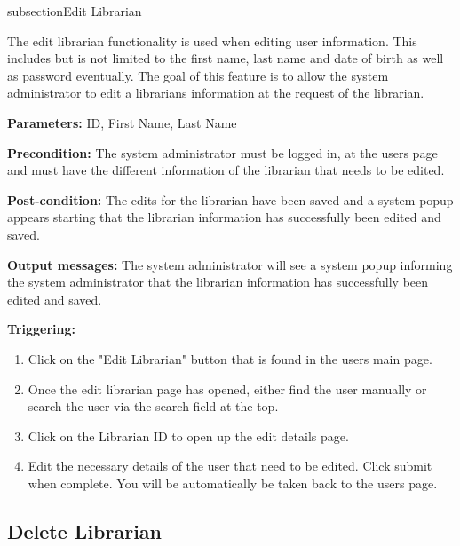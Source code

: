 subsection{Edit Librarian}

The edit librarian functionality is used when editing user information. This includes but is not limited to the first name, last name and date of birth as well as password eventually. The goal of this feature is to allow the system administrator to edit a librarians information at the request of the librarian. 

\begin{description}

\item \textbf{Parameters:} ID, First Name, Last Name

\item \textbf{Precondition:} The system administrator must be logged in, at the users page and must have the different information of the librarian that needs to be edited.

\item \textbf{Post-condition:} The edits for the librarian have been saved and a system popup appears starting that the librarian information has successfully been edited and saved. 

\item \textbf{Output messages:} The system administrator will see a system popup informing the system administrator that the librarian information has successfully been edited and saved.

\item \textbf{Triggering:}
\begin{enumerate}

\item Click on the "Edit Librarian" button that is found in the users main page.

\item Once the edit librarian page has opened, either find the user manually or search the user via the search field at the top.

\item Click on the Librarian ID to open up the edit details page. 

\item Edit the necessary details of the user that need to be edited. Click submit when complete. You will be automatically be taken back to the users page.

\end{enumerate}

\end{description}


\subsection{Delete Librarian}

